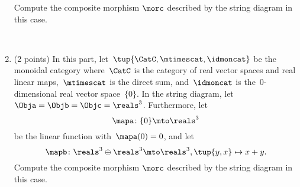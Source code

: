\documentclass[paper=8.125in:10.250in,pagesize=pdftex,
    headinclude=false,footinclude=false,oneside,egregdoesnotlikesansseriftitles]{kaobook}
\begin{document}
\begin{gradedexercise}
\begin{enumerate}
Compute the composite morphism $\morc$ described by the string diagram in this case.

\

\item (2 points) In this part, let~$\tup{\CatC,\mtimescat,\idmoncat}$ be the monoidal category where~$\CatC$ is the category of real vector spaces and real linear maps,~$\mtimescat$ is the direct sum, and~$\idmoncat$ is the~$0$-dimensional real vector space~$\{ 0 \}$.
In the string diagram, let~$\Obja = \Objb = \Objc = \reals^3$.
Furthermore, let~
$$\mapa\colon \{ 0 \} \mto \reals^3$$ 
be the linear function with~$\mapa(0) = 0$, and let~
$$\mapb \colon \reals^3 \oplus \reals^3 \mto \reals^3, \tup{y, x} \mapsto x + y.$$
Compute the composite morphism $\morc$ described by the string diagram in this case.

%

\end{enumerate}
\end{gradedexercise}


\newpage
\end{document}
